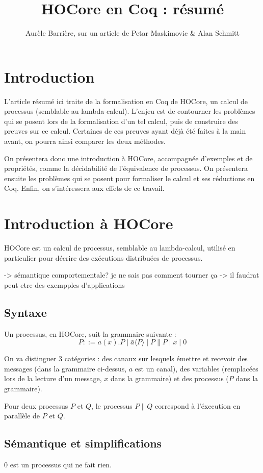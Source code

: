 \documentclass[11pt]{article}
\title{HOCore en Coq : résumé}
\author{Aurèle Barrière, sur un article de Petar Maskimovic \& Alan Schmitt}
\begin{document}
\nocite{*}
\maketitle
\tableofcontents %


\section{Introduction}
L'article résumé ici traite de la formalisation en Coq de HOCore, un calcul de processus (semblable au lambda-calcul). L'enjeu est de contourner les problèmes qui se posent lors de la formalisation d'un tel calcul, puis de construire des preuves sur ce calcul. Certaines de ces preuves ayant déjà été faites à la main avant, on pourra ainsi comparer les deux méthodes.

On présentera donc une introduction à HOCore, accompagnée d'exemples et de propriétés, comme la décidabilité de l'équivalence de processus.
On présentera ensuite les problèmes qui se posent pour formaliser le calcul et ses réductions en Coq.
Enfin, on s'intéressera aux effets de ce travail.

\section{Introduction à HOCore}
HOCore est un calcul de processus, semblable au lambda-calcul, utilisé en particulier pour décrire des exécutions distribuées de processus.

-> sémantique comportementale? je ne sais pas comment tourner ça
-> il faudrat peut etre des exempples d'applications


\subsection{Syntaxe}
Un processus, en HOCore, suit la grammaire suivante :
$$ P ::= a(x).P \mid \bar{a}\langle P\rangle \mid P\|P \mid x \mid 0 $$

On va distinguer 3 catégories : des canaux sur lesquels émettre et recevoir des messages (dans la grammaire ci-dessus, $a$ est un canal), des variables (remplacées lors de la lecture d'un message, $x$ dans la grammaire) et des processus ($P$ dans la grammaire).

Pour deux processus $P$ et $Q$, le processus $P\|Q$ correspond à l'éxecution en parallèle de $P$ et $Q$.


\subsection{Sémantique et simplifications}
$0$ est un processus qui ne fait rien.
\end{document}
